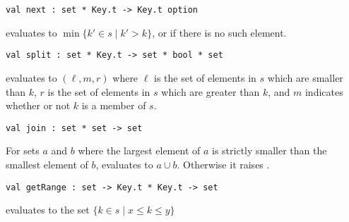 \begin{cluster}
\label{grp:grm:ordset-interface::next}

\begin{gram}[next]
\label{grm:ordset-interface::next}
\begin{verbatim}
val next : set * Key.t -> Key.t option
\end{verbatim}
 evaluates to $\min \{ k' \in s \mathbin| k' > k \}$, or
 if there is no such element.

\end{gram}
\end{cluster}

\begin{cluster}
\label{grp:grm:ordset-interface::split}

\begin{gram}[split]
\label{grm:ordset-interface::split}
\begin{verbatim}
val split : set * Key.t -> set * bool * set
\end{verbatim}
 evaluates to $(\ell, m, r)$ where $\ell$ is the set of elements
in $s$ which are smaller than $k$, $r$ is the set of elements in $s$ which
are greater than $k$, and $m$ indicates whether or not $k$ is a member of $s$.

\end{gram}
\end{cluster}

\begin{cluster}
\label{grp:grm:ordset-interface::join}

\begin{gram}[join]
\label{grm:ordset-interface::join}
\begin{verbatim}
val join : set * set -> set
\end{verbatim}
For sets $a$ and $b$ where the largest element of $a$ is strictly smaller than
the smallest element of $b$,  evaluates to $a \cup b$.
Otherwise it raises .

\end{gram}
\end{cluster}

\begin{cluster}
\label{grp:grm:ordset-interface::getrange}

\begin{gram}[getRange]
\label{grm:ordset-interface::getrange}
\begin{verbatim}
val getRange : set -> Key.t * Key.t -> set
\end{verbatim}
 evaluates to the set
$\{ k \in s \mathbin| x \leq k \leq y \}$

\end{gram}
\end{cluster}

